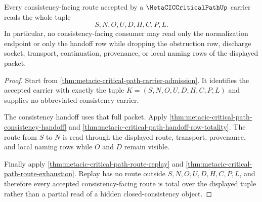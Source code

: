 \begin{theorem}
\label{thm:metacic-critical-path-consistency-route-totality}
Every consistency-facing route accepted by a $\MetaCICCriticalPathUp$ carrier reads the whole tuple
$$
S,N,O,U,D,H,C,P,L.
$$
In particular, no consistency-facing consumer may read only the normalization endpoint or only the handoff row while dropping the obstruction row, discharge socket, transport, continuation, provenance, or local naming rows of the displayed packet.
\end{theorem}
\begin{proof}
Start from \autoref{thm:metacic-critical-path-carrier-admission}. It identifies the accepted carrier with exactly the tuple $K=(S,N,O,U,D,H,C,P,L)$ and supplies no abbreviated consistency carrier.

The consistency handoff uses that full packet. Apply \autoref{thm:metacic-critical-path-consistency-handoff} and \autoref{thm:metacic-critical-path-handoff-row-totality}. The route from $S$ to $N$ is read through the displayed route, transport, provenance, and local naming rows while $O$ and $D$ remain visible.

Finally apply \autoref{thm:metacic-critical-path-route-replay} and \autoref{thm:metacic-critical-path-route-exhaustion}. Replay has no route outside $S,N,O,U,D,H,C,P,L$, and therefore every accepted consistency-facing route is total over the displayed tuple rather than a partial read of a hidden closed-consistency object.
\end{proof}

